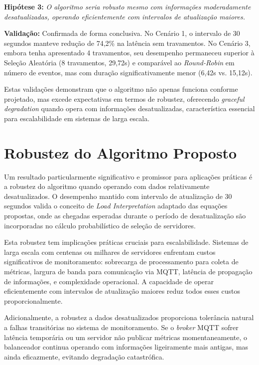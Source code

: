 \textbf{Hipótese 3:} \textit{O algoritmo seria robusto mesmo com informações moderadamente desatualizadas, operando eficientemente com intervalos de atualização maiores.}

\textbf{Validação:} Confirmada de forma conclusiva. No Cenário 1, o intervalo de 30 segundos manteve redução de 74,2\% na latência sem travamentos. No Cenário 3, embora tenha apresentado 4 travamentos, seu desempenho permaneceu superior à Seleção Aleatória (8 travamentos, 29,72s) e comparável ao \textit{Round-Robin} em número de eventos, mas com duração significativamente menor (6,42s vs. 15,12s).

Estas validações demonstram que o algoritmo não apenas funciona conforme projetado, mas excede expectativas em termos de robustez, oferecendo \textit{graceful degradation} quando opera com informações desatualizadas, característica essencial para escalabilidade em sistemas de larga escala.

\section{Robustez do Algoritmo Proposto}

Um resultado particularmente significativo e promissor para aplicações práticas é a robustez do algoritmo quando operando com dados relativamente desatualizados. O desempenho mantido com intervalo de atualização de 30 segundos valida o conceito de \textit{Load Interpretation} adaptado das equações propostas, onde as chegadas esperadas durante o período de desatualização são incorporadas no cálculo probabilístico de seleção de servidores.

Esta robustez tem implicações práticas cruciais para escalabilidade. Sistemas de larga escala com centenas ou milhares de servidores enfrentam custos significativos de monitoramento: sobrecarga de processamento para coleta de métricas, largura de banda para comunicação via MQTT, latência de propagação de informações, e complexidade operacional. A capacidade de operar eficientemente com intervalos de atualização maiores reduz todos esses custos proporcionalmente.

Adicionalmente, a robustez a dados desatualizados proporciona tolerância natural a falhas transitórias no sistema de monitoramento. Se o \textit{broker} MQTT sofrer latência temporária ou um servidor não publicar métricas momentaneamente, o balanceador continua operando com informações ligeiramente mais antigas, mas ainda eficazmente, evitando degradação catastrófica.

